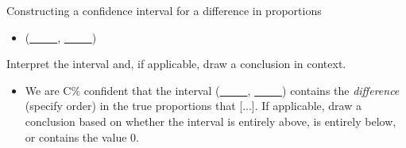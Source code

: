 \begin{onebox}{Constructing a confidence interval for a difference in proportions}
\begin{itemize}
\begin{itemize}
\end{itemize}
\item[] (\underline{\ \ \ \ \ }, \underline{\ \ \ \ \ })
\end{itemize}
   Interpret the interval and, if applicable, draw a conclusion in context.\vspace{-1mm}
\begin{itemize}
\item[] We are C\% confident that the interval (\underline{\ \ \ \ \ }, \underline{\ \ \ \ \ }) contains the \emph{difference} (specify order) in the true proportions that [...].   If applicable, draw a conclusion based on whether the interval is entirely above, is entirely below, or contains the value 0.  

\end{itemize}\end{onebox}


